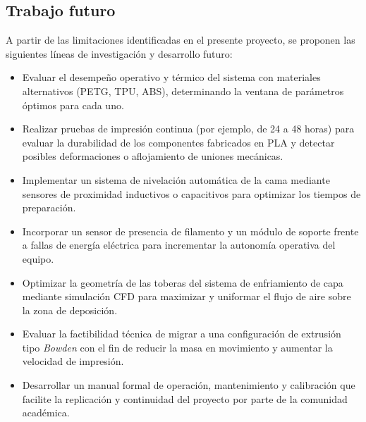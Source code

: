 \subsection*{Trabajo futuro}
A partir de las limitaciones identificadas en el presente proyecto, se proponen las siguientes líneas de investigación y desarrollo futuro:
\begin{itemize}
    \item Evaluar el desempeño operativo y térmico del sistema con materiales alternativos (PETG, TPU, ABS), determinando la ventana de parámetros óptimos para cada uno.
    \item Realizar pruebas de impresión continua (por ejemplo, de 24 a 48 horas) para evaluar la durabilidad de los componentes fabricados en PLA y detectar posibles deformaciones o aflojamiento de uniones mecánicas.
    \item Implementar un sistema de nivelación automática de la cama mediante sensores de proximidad inductivos o capacitivos para optimizar los tiempos de preparación.
    \item Incorporar un sensor de presencia de filamento y un módulo de soporte frente a fallas de energía eléctrica para incrementar la autonomía operativa del equipo.
    \item Optimizar la geometría de las toberas del sistema de enfriamiento de capa mediante simulación CFD para maximizar y uniformar el flujo de aire sobre la zona de deposición.
    \item Evaluar la factibilidad técnica de migrar a una configuración de extrusión tipo \textit{Bowden} con el fin de reducir la masa en movimiento y aumentar la velocidad de impresión.
    \item Desarrollar un manual formal de operación, mantenimiento y calibración que facilite la replicación y continuidad del proyecto por parte de la comunidad académica.
\end{itemize}





